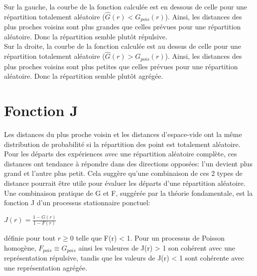 \documentclass[stage2a]{tnreport}
\begin{document}
Sur la gauche, la courbe de la fonction calculée est en dessous de celle pour une répartition totalement aléatoire (\begin{math}\hat{G}(r) < G_{pois}(r) \end{math}). Ainsi, les distances des plus proches voisins sont plus grandes que celles prévues pour une répartition aléatoire. Donc la répartition semble plutôt répulsive.\\
\indent
Sur la droite, la courbe de la fonction calculée est au dessus de celle pour une répartition totalement aléatoire (\begin{math}\hat{G}(r) > G_{pois}(r) \end{math}). Ainsi, les distances des plus proches voisins sont plus petites que celles prévues pour une répartition aléatoire. Donc la répartition semble plutôt agrégée.\\



\section{Fonction J}

Les distances du plus proche voisin et les distances d'espace-vide ont la même distribution de probabilité si la répartition des point est totalement aléatoire. Pour les départs des expériences avec une répartition aléatoire complète, ces distances ont tendance à répondre dans des directions opposées: l'un devient plus grand et l'autre plus petit. Cela suggère qu'une combinaison de ces 2 types de distance pourrait être utile pour évaluer les départs d'une répartition aléatoire.\\

Une combinaison pratique de G et F, suggérée par la théorie fondamentale, est la fonction J d'un processus stationnaire ponctuel:
\begin{center}\begin{math} J(r) = \frac{1-G(r)}{1-F(r)} \end{math}\end{center}
définie pour tout \begin{math} r \geq 0 \end{math} telle que F(r) < 1. Pour un processus de Poisson homogène, \begin{math} F_{pois} \equiv G_{pois} \end{math} ainsi les valeures de J(r) > 1 son cohérent avec une représentation répulsive, tandis que les valeurs de J(r) < 1 sont cohérente avec une représentation agrégée.
\end{document}
